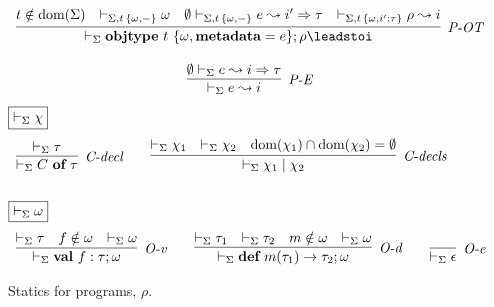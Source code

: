 \begin{figure}[t]
\[\begin{array}{c}
\infer[\textit{P-OT}]
          {%
	    \vdash_\Sigma  \keyw{objtype}~ t~\{{\omega}, \keyw{metadata}=e\}; \rho \leadsto%
           i
       }
	  {t \notin \text{dom}(\Sigma) &
	  \vdash_{\Sigma, t\,\{\omega, -\}} \omega &
	   \emptyset \vdash_{\Sigma, t\,\{\omega,-\}} e \leadsto i' \Rightarrow \tau &  \vdash_{\Sigma, t\,\{\omega, i':\tau\}} \rho \leadsto i }
	   \\[3ex] 
\infer[\textit{P-E}]
	{\vdash_\Sigma  e \leadsto i} 
	{\emptyset \vdash_\Sigma e \leadsto i \Rightarrow \tau}
\end{array}
\vspace{-20px}
\]
$\fbox{$\vdash_\Sigma \chi$}$
\[
\begin{array}{c}
\infer[\textit{C-decl}]
	{\vdash_\Sigma  C~\keyw{of}~\tau} 
	{\vdash_\Sigma \tau   }
~~~~~~
\infer[\textit{C-decls}]
	{\vdash_\Sigma  \chi_1 \bnfalt \chi_2} 
	{\vdash_\Sigma \chi_1 & \vdash_\Sigma \chi_2 & \text{dom}(\chi_1) \intersect \text{dom}(\chi_2) = \emptyset}\\[3ex]
\end{array}
\vspace{-10px}
\]
$\fbox{$\vdash_\Sigma \omega$}$
\[
\begin{array}{c}
\infer[\textit{O-v}]
	{\vdash_\Sigma \keyw{val}~ f:\tau; \omega }
	{\vdash_\Sigma \tau & f \notin \omega & \vdash_\Sigma \omega }
~~~~~~	
\infer[\textit{O-d}]
	{\vdash_\Sigma \keyw{def}~ m(\tau_1)\rightarrow\tau_2; \omega }
	{\vdash_\Sigma \tau_1 & \vdash_\Sigma \tau_2 & m \notin \omega & \vdash_\Sigma \omega }
~~~~~~
\infer[\textit{O-e}]
	{\vdash_\Sigma \epsilon}
	{ }
\end{array}
\]
\vspace{-15px}
\caption{Statics for programs, $\rho$.}
\vspace{-15px}
\end{figure}
